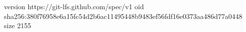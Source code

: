 version https://git-lfs.github.com/spec/v1
oid sha256:380f76958e6a15fc54d2b6ac11495448b9483ef56fdf16e0373aa486d77a0448
size 2155
